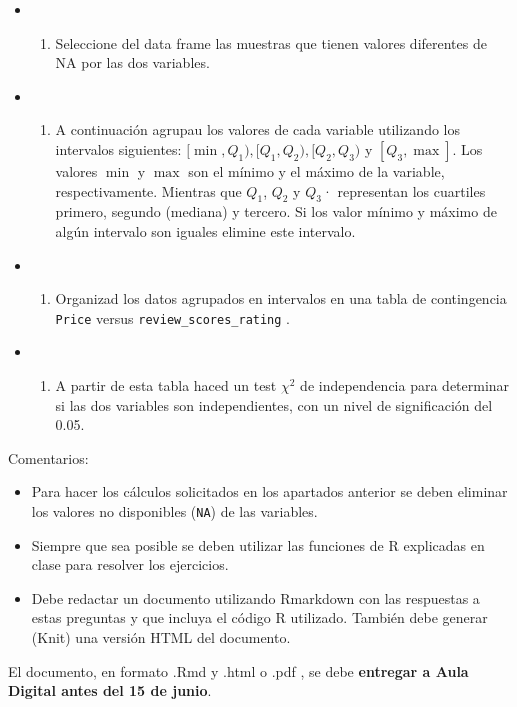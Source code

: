 \documentclass[
]{article}
\providecommand{\tightlist}{%
  \setlength{\itemsep}{0pt}\setlength{\parskip}{0pt}}
\begin{document}
\begin{enumerate}
  \begin{itemize}
  \item
    \begin{enumerate}
    \def\labelenumii{\alph{enumii})}
    \tightlist
    \item
      Seleccione del data frame las muestras que tienen valores
      diferentes de NA por las dos variables.
    \end{enumerate}
  \item
    \begin{enumerate}
    \def\labelenumii{\alph{enumii})}
    \setcounter{enumii}{1}
    \tightlist
    \item
      A continuación agrupau los valores de cada variable utilizando los
      intervalos siguientes: \([ \min, Q_1), [Q_1, Q_2), [Q_2, Q_3)\) y
      \([Q_3, \max]\). Los valores \(\min\) y \(\max\) son el mínimo y
      el máximo de la variable, respectivamente. Mientras que \(Q_1\),
      \(Q_2\) y \(Q_3\)· representan los cuartiles primero, segundo
      (mediana) y tercero. Si los valor mínimo y máximo de algún
      intervalo son iguales elimine este intervalo.
    \end{enumerate}
  \item
    \begin{enumerate}
    \def\labelenumii{\alph{enumii})}
    \setcounter{enumii}{2}
    \tightlist
    \item
      Organizad los datos agrupados en intervalos en una tabla de
      contingencia \texttt{Price} versus \texttt{review\_scores\_rating}
      .
    \end{enumerate}
  \item
    \begin{enumerate}
    \def\labelenumii{\alph{enumii})}
    \setcounter{enumii}{3}
    \tightlist
    \item
      A partir de esta tabla haced un test \(\chi^2\) de independencia
      para determinar si las dos variables son independientes, con un
      nivel de significación del 0.05.
    \end{enumerate}
  \end{itemize}
\end{enumerate}

Comentarios:

\begin{itemize}
\item
  Para hacer los cálculos solicitados en los apartados anterior se deben
  eliminar los valores no disponibles (\texttt{NA}) de las variables.
\item
  Siempre que sea posible se deben utilizar las funciones de R
  explicadas en clase para resolver los ejercicios.
\item
  Debe redactar un documento utilizando Rmarkdown con las respuestas a
  estas preguntas y que incluya el código R utilizado. También debe
  generar (Knit) una versión HTML del documento.
\end{itemize}

El documento, en formato .Rmd y .html o .pdf , se debe \textbf{entregar
a Aula Digital antes del 15 de junio}.
\end{document}
